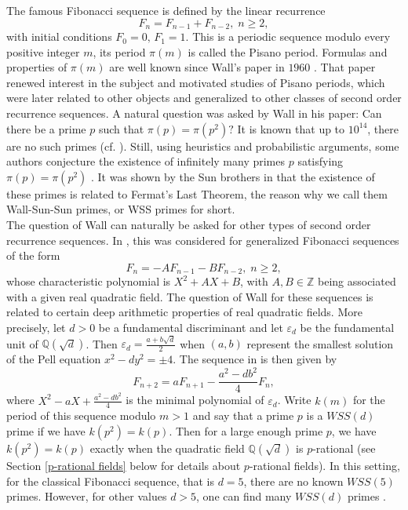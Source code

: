 \documentclass[12pt,reqno]{amsart}
\newcommand{\Z}{\mathbb{Z}}
\newcommand{\Q}{\mathbb{Q}}
\begin{document}
The famous Fibonacci sequence is defined by the linear recurrence
$$F_{n}=F_{n-1}+F_{n-2},\; n\ge 2,$$
with initial conditions $F_0=0,\,F_1=1.$
This is a periodic sequence modulo every positive integer $m$, its period $\pi(m)$ is called the Pisano period.
Formulas and properties of $\pi(m)$ are well known since Wall's paper in $1960$ \cite{W}. That paper renewed interest in the subject
and motivated studies of Pisano periods, which were later related to other objects and generalized to other classes of second order recurrence
sequences. A natural question was asked by Wall in his paper: Can there be a prime $p$ such that $\pi(p)=\pi(p^2)?$
It is known that up to $10^{14}$, there are no such primes (cf. \cite{MR}). Still, using heuristics and probabilistic arguments, some authors conjecture the existence of infinitely many primes $p$ satisfying $\pi(p)=\pi(p^2)$ \cite{EJ,Kl}. It was shown by the Sun brothers in \cite{SS} that the existence of these primes is related to Fermat's Last Theorem, the reason why we call them Wall-Sun-Sun primes, or WSS primes for short.\\
The question of Wall can naturally be asked for other types of second order recurrence sequences. In \cite{B,B2}, this was considered for generalized Fibonacci sequences of the form $$F_{n}=-AF_{n-1}-BF_{n-2},\; n\ge 2,$$
whose characteristic polynomial is $X^2+AX+B$, with $A,B \in \Z$ being associated with a given real quadratic field. The question of Wall for these sequences is related to certain deep arithmetic properties of real quadratic fields. More precisely, let $d>0$ be a fundamental discriminant and let $\varepsilon_d$ be the fundamental unit of $\Q(\sqrt{d})$. Then $\varepsilon_d =\frac{a+b\sqrt{d}}{2}$ when $(a,b)$ represent the smallest solution of the Pell equation $x^2-dy^2=\pm4$. The sequence in \cite{B,B2} is then given by $$F_{n+2}=aF_{n+1}-\frac{a^2-db^2}{4}F_n,$$ where $X^2-aX+\frac{a^2-db^2}{4}$ is the minimal polynomial of $\varepsilon_d$. Write $k(m)$ for the period of this sequence modulo $m>1$ and say that a prime $p$ is a $WSS(d)$ prime if we have $k(p^2)=k(p)$. Then for a large enough prime $p$, we have $k(p^2)=k(p)$ exactly when the quadratic field $\Q(\sqrt{d})$ is $p$-rational \cite{B,B2} (see Section \ref{p-rational fields} below for details about $p$-rational fields). In this setting, for the classical Fibonacci sequence, that is $d=5$, there are no known $WSS(5)$ primes. However, for other values $d>5$, one can find many $WSS(d)$ primes \cite[Table]{B}.
\vspace{1em}
\end{document}
